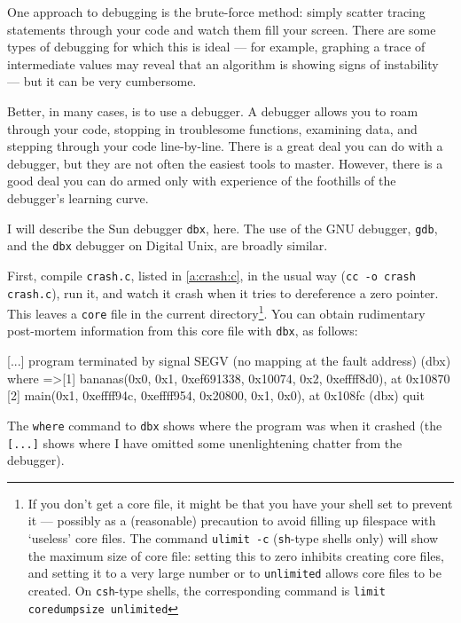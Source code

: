 \documentclass[11pt,oneside,chapters]{starlink}
\begin{document}
One approach to debugging is the brute-force method:
simply scatter tracing statements through your code and
watch them fill your screen.  There are some types of
debugging for which this is ideal --- for example, graphing
a trace of intermediate values may reveal that an
algorithm is showing signs of instability --- but it can be
very cumbersome.

Better, in many cases, is to use a debugger.  A debugger
allows you to roam through your code, stopping in
troublesome functions, examining data, and stepping
through your code line-by-line.  There is a great deal you
can do with a debugger, but they are not often the easiest
tools to master.  However, there is a good deal you can do
armed only with experience of the foothills of the
debugger's learning curve.

I will describe the Sun debugger \texttt{dbx}, here.
The use of the GNU debugger, \texttt{gdb}, and the
\texttt{dbx} debugger on Digital Unix, are broadly
similar.

First, compile \texttt{crash.c}, listed in \ref{a:crash:c},
in the usual way (\texttt{cc -o crash crash.c}),
run it, and watch it crash when it tries
to dereference a zero pointer.  This leaves a
\texttt{core} file in the current
directory\footnote{If you don't get a core file, it might
be that you have your shell set to prevent it --- possibly
as a (reasonable) precaution to avoid filling up filespace
with `useless' core files.  The command \texttt{ulimit -c}
(\texttt{sh}-type shells only) will show the
maximum size of core file: setting this to zero inhibits
creating core files, and setting it to a very large number
or to \texttt{unlimited} allows core files to be
created.  On \texttt{csh}-type shells, the
corresponding command is \texttt{limit coredumpsize unlimited}}.  You can obtain rudimentary
post-mortem information from this core file with
\texttt{dbx}, as follows:

\begin{terminalv}
[...]
program terminated by signal SEGV (no mapping at the fault address)
(dbx) where
=>[1] bananas(0x0, 0x1, 0xef691338, 0x10074, 0x2, 0xeffff8d0), at 0x10870
[2] main(0x1, 0xeffff94c, 0xeffff954, 0x20800, 0x1, 0x0), at 0x108fc
(dbx) quit
\end{terminalv}

The \texttt{where} command to \texttt{dbx} shows
where the program was when it crashed (the
\texttt{[...]} shows where I have omitted some
unenlightening chatter from the debugger).
\end{document}
